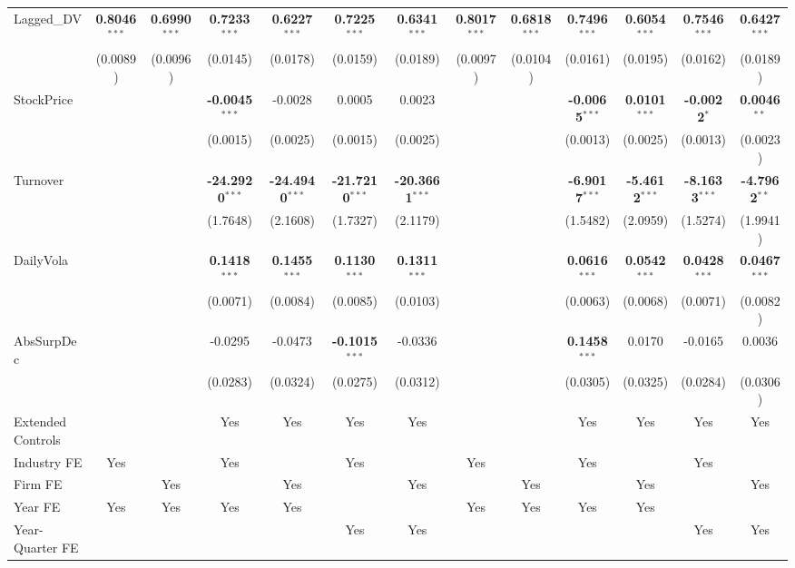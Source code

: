 \documentclass[11pt,a4paper]{article}
\begin{document}
\begin{table}[htbp]
\begin{tabular}{lcccccccccccc}
Lagged\_DV & \textbf{0.8046}$^{***}$ & \textbf{0.6990}$^{***}$ & \textbf{0.7233}$^{***}$ & \textbf{0.6227}$^{***}$ & \textbf{0.7225}$^{***}$ & \textbf{0.6341}$^{***}$ & \textbf{0.8017}$^{***}$ & \textbf{0.6818}$^{***}$ & \textbf{0.7496}$^{***}$ & \textbf{0.6054}$^{***}$ & \textbf{0.7546}$^{***}$ & \textbf{0.6427}$^{***}$ \\
 & (0.0089) & (0.0096) & (0.0145) & (0.0178) & (0.0159) & (0.0189) & (0.0097) & (0.0104) & (0.0161) & (0.0195) & (0.0162) & (0.0189) \\
StockPrice &  &  & \textbf{-0.0045}$^{***}$ & -0.0028 & 0.0005 & 0.0023 &  &  & \textbf{-0.0065}$^{***}$ & \textbf{0.0101}$^{***}$ & \textbf{-0.0022}$^{*}$ & \textbf{0.0046}$^{**}$ \\
 &  &  & (0.0015) & (0.0025) & (0.0015) & (0.0025) &  &  & (0.0013) & (0.0025) & (0.0013) & (0.0023) \\
Turnover &  &  & \textbf{-24.2920}$^{***}$ & \textbf{-24.4940}$^{***}$ & \textbf{-21.7210}$^{***}$ & \textbf{-20.3661}$^{***}$ &  &  & \textbf{-6.9017}$^{***}$ & \textbf{-5.4612}$^{***}$ & \textbf{-8.1633}$^{***}$ & \textbf{-4.7962}$^{**}$ \\
 &  &  & (1.7648) & (2.1608) & (1.7327) & (2.1179) &  &  & (1.5482) & (2.0959) & (1.5274) & (1.9941) \\
DailyVola &  &  & \textbf{0.1418}$^{***}$ & \textbf{0.1455}$^{***}$ & \textbf{0.1130}$^{***}$ & \textbf{0.1311}$^{***}$ &  &  & \textbf{0.0616}$^{***}$ & \textbf{0.0542}$^{***}$ & \textbf{0.0428}$^{***}$ & \textbf{0.0467}$^{***}$ \\
 &  &  & (0.0071) & (0.0084) & (0.0085) & (0.0103) &  &  & (0.0063) & (0.0068) & (0.0071) & (0.0082) \\
AbsSurpDec &  &  & -0.0295 & -0.0473 & \textbf{-0.1015}$^{***}$ & -0.0336 &  &  & \textbf{0.1458}$^{***}$ & 0.0170 & -0.0165 & 0.0036 \\
 &  &  & (0.0283) & (0.0324) & (0.0275) & (0.0312) &  &  & (0.0305) & (0.0325) & (0.0284) & (0.0306) \\
\midrule
Extended Controls &  &  & Yes & Yes & Yes & Yes &  &  & Yes & Yes & Yes & Yes \\
Industry FE & Yes &  & Yes &  & Yes &  & Yes &  & Yes &  & Yes &  \\
Firm FE &  & Yes &  & Yes &  & Yes &  & Yes &  & Yes &  & Yes \\
Year FE & Yes & Yes & Yes & Yes &  &  & Yes & Yes & Yes & Yes &  &  \\
Year-Quarter FE &  &  &  &  & Yes & Yes &  &  &  &  & Yes & Yes \\

\end{tabular}
\end{table}
\end{document}

